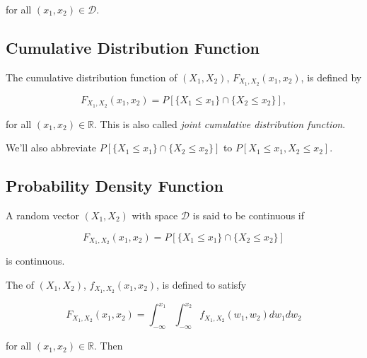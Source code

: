 \documentclass{article}
\begin{document}
            for all $ (x_{1}, x_{2}) \in \mathcal{D} $.

        \subsection{Cumulative Distribution Function}

            The cumulative distribution function of $ (X_{1}, X_{2}) $, $
            F_{X_{1}, X_{2}} (x_{1}, x_{2}) $, is defined by

            \begin{equation*}
                  F_{X_{1}, X_{2}} (x_{1}, x_{2}) = P [  \{ X_{1} \leq x_{1} \}
                  \cap  \{ X_{2} \leq x_{2} \}],
            \end{equation*}

            for all $ (x_{1}, x_{2}) \in \mathbb{R} $. This is also called
            \textit{joint cumulative distribution function}.

            We'll also abbreviate $
            P [  \{ X_{1} \leq x_{1} \} \cap  \{ X_{2} \leq x_{2} \}] $ to
            $ P [ X_{1} \leq x_{1}, X_{2} \leq x_{2} ] $.

        \subsection{Probability Density Function}

            A random vector $ (X_{1}, X_{2}) $ with space $ \mathcal{D} $ is
            said to be continuous if

            \begin{equation*}
                F_{X_{1}, X_{2}}(x_{1}, x_{2}) = P [  \{ X_{1} \leq x_{1} \}
                  \cap  \{ X_{2} \leq x_{2} \} ]
            \end{equation*}

            is continuous.

            The  of $ (X_{1}, X_{2})
            $, $ f_{X_{1}, X_{2}}(x_{1}, x_{2}) $, is defined to satisfy

            \begin{equation*}
                 F_{X_{1}, X_{2}} (x_{1}, x_{2}) = \int_{-\infty}^{x_{1}}
                     \int_{-\infty}^{x_{2}} f_{X_{1}, X_{2}} (w_{1}, w_{2}) d w_{1} d w_{2}
            \end{equation*}

            for all $ (x_{1}, x_{2}) \in \mathbb{R} $. Then
\end{document}
